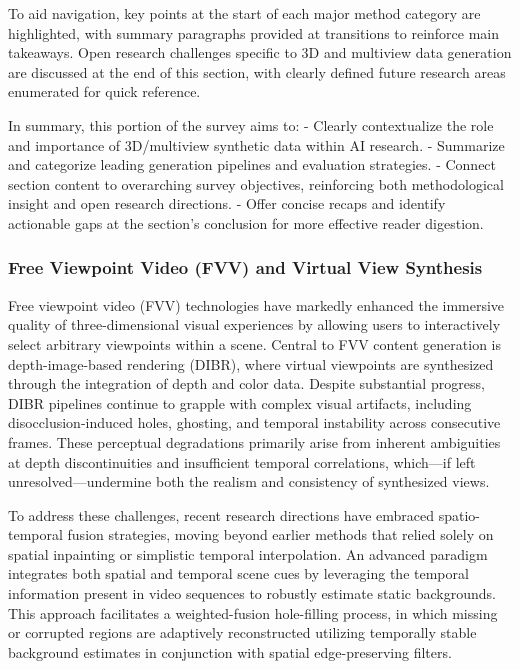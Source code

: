 \documentclass[sigconf]{acmart}
\begin{document}
To aid navigation, key points at the start of each major method category are highlighted, with summary paragraphs provided at transitions to reinforce main takeaways. Open research challenges specific to 3D and multiview data generation are discussed at the end of this section, with clearly defined future research areas enumerated for quick reference.

In summary, this portion of the survey aims to:
- Clearly contextualize the role and importance of 3D/multiview synthetic data within AI research.
- Summarize and categorize leading generation pipelines and evaluation strategies.
- Connect section content to overarching survey objectives, reinforcing both methodological insight and open research directions.
- Offer concise recaps and identify actionable gaps at the section's conclusion for more effective reader digestion.

\subsubsection{Free Viewpoint Video (FVV) and Virtual View Synthesis}

Free viewpoint video (FVV) technologies have markedly enhanced the immersive quality of three-dimensional visual experiences by allowing users to interactively select arbitrary viewpoints within a scene. Central to FVV content generation is depth-image-based rendering (DIBR), where virtual viewpoints are synthesized through the integration of depth and color data. Despite substantial progress, DIBR pipelines continue to grapple with complex visual artifacts, including disocclusion-induced holes, ghosting, and temporal instability across consecutive frames. These perceptual degradations primarily arise from inherent ambiguities at depth discontinuities and insufficient temporal correlations, which—if left unresolved—undermine both the realism and consistency of synthesized views.

To address these challenges, recent research directions have embraced spatio-temporal fusion strategies, moving beyond earlier methods that relied solely on spatial inpainting or simplistic temporal interpolation. An advanced paradigm integrates both spatial and temporal scene cues by leveraging the temporal information present in video sequences to robustly estimate static backgrounds. This approach facilitates a weighted-fusion hole-filling process, in which missing or corrupted regions are adaptively reconstructed utilizing temporally stable background estimates in conjunction with spatial edge-preserving filters.
\end{document}
